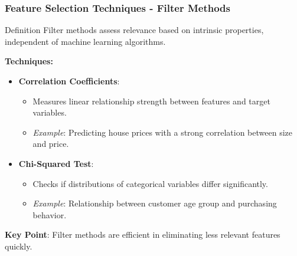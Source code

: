 \documentclass[aspectratio=169]{beamer}
\begin{document}
\begin{frame}[fragile]
    \frametitle{Feature Selection Techniques - Filter Methods}
    \begin{block}{Definition}
        Filter methods assess relevance based on intrinsic properties, independent of machine learning algorithms.
    \end{block}
    \textbf{Techniques:}
    \begin{itemize}
        \item \textbf{Correlation Coefficients}:
            \begin{itemize}
                \item Measures linear relationship strength between features and target variables.
                \item \textit{Example}: Predicting house prices with a strong correlation between size and price.
            \end{itemize}
        \item \textbf{Chi-Squared Test}:
            \begin{itemize}
                \item Checks if distributions of categorical variables differ significantly.
                \item \textit{Example}: Relationship between customer age group and purchasing behavior.
            \end{itemize}
    \end{itemize}
    \textbf{Key Point}: Filter methods are efficient in eliminating less relevant features quickly.
\end{frame}
\end{document}
